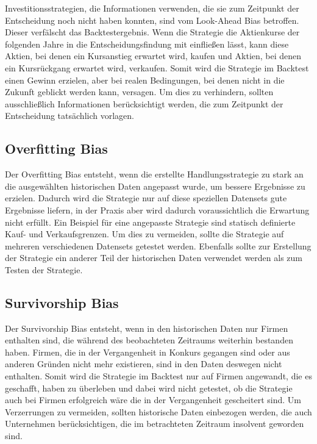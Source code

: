 Investitionsstrategien, die Informationen verwenden, die sie zum Zeitpunkt der Entscheidung noch nicht haben konnten, sind vom Look-Ahead Bias betroffen. Dieser verfälscht das Backtestergebnis.
Wenn die Strategie die Aktienkurse der folgenden Jahre in die Entscheidungsfindung mit einfließen lässt, kann diese Aktien, bei denen ein Kursanstieg erwartet wird, kaufen und Aktien, bei denen ein Kursrückgang erwartet wird, verkaufen.
Somit wird die Strategie im Backtest einen Gewinn erzielen, aber bei realen Bedingungen, bei denen nicht in die Zukunft geblickt werden kann, versagen.
Um dies zu verhindern, sollten ausschließlich Informationen berücksichtigt werden, die zum Zeitpunkt der Entscheidung tatsächlich vorlagen.
\cite{daniel2008lookaheadbenchmarkbiasportfolio}

\subsection{Overfitting Bias}
\label{subsec:OverfittingBias}

Der Overfitting Bias entsteht, wenn die erstellte Handlungsstrategie zu stark an die ausgewählten historischen Daten angepasst wurde, um bessere Ergebnisse zu erzielen. 
Dadurch wird die Strategie nur auf diese speziellen Datensets gute Ergebnisse liefern, in der Praxis aber wird dadurch voraussichtlich die Erwartung nicht erfüllt. Ein Beispiel für eine angepasste Strategie sind statisch definierte Kauf- und Verkaufsgrenzen.
Um dies zu vermeiden, sollte die Strategie auf mehreren verschiedenen Datensets getestet werden. Ebenfalls sollte zur Erstellung der Strategie ein anderer Teil der historischen Daten verwendet werden als zum Testen der Strategie. 
\cite{Bailey2015PBO}

\subsection{Survivorship Bias}
\label{subsec:SurvivorshipBias}

Der Survivorship Bias entsteht, wenn in den historischen Daten nur Firmen enthalten sind, die während des beobachteten Zeitraums weiterhin bestanden haben.
Firmen, die in der Vergangenheit in Konkurs gegangen sind oder aus anderen Gründen nicht mehr existieren, sind in den Daten deswegen nicht enthalten.
Somit wird die Strategie im Backtest nur auf Firmen angewandt, die es geschafft, haben zu überleben und dabei wird nicht getestet, ob die Strategie auch bei Firmen erfolgreich wäre die in der Vergangenheit gescheitert sind.
Um Verzerrungen zu vermeiden, sollten historische Daten einbezogen werden, die auch Unternehmen berücksichtigen, die im betrachteten Zeitraum insolvent geworden sind.
\cite{10.1093/rfs/5.4.553} \cite{10.1093/rfs/15.5.1439}

